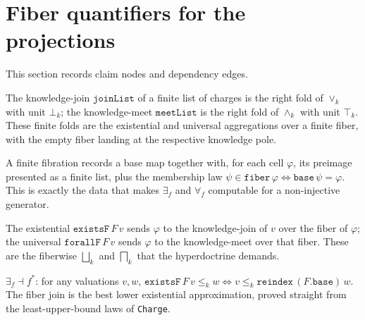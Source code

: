 \section{Fiber quantifiers for the projections}

This section records claim nodes and dependency edges.

\begin{proposition}\label{thm:charge-joinList}\leanok{}
The knowledge-join $\texttt{joinList}$ of a finite list of charges is the right
fold of $\vee_k$ with unit $\bot_k$; the knowledge-meet $\texttt{meetList}$ is the
right fold of $\wedge_k$ with unit $\top_k$. These finite folds are the
existential and universal aggregations over a finite fiber, with the empty fiber
landing at the respective knowledge pole.
\end{proposition}
\begin{proposition}\label{thm:finiteFibration}\leanok{}
A finite fibration records a base map together with, for each cell $\varphi$, its
preimage presented as a finite list, plus the membership law $\psi \in
\texttt{fiber}\,\varphi \iff \texttt{base}\,\psi = \varphi$. This is exactly the
data that makes $\exists_{f}$ and $\forall_{f}$ computable for a non-injective
generator.
\end{proposition}
\begin{proposition}\label{thm:existsF}\leanok{}
The existential $\texttt{existsF}\,F\,v$ sends $\varphi$ to the knowledge-join of
$v$ over the fiber of $\varphi$; the universal $\texttt{forallF}\,F\,v$ sends
$\varphi$ to the knowledge-meet over that fiber. These are the fiberwise
$\bigsqcup_k$ and $\bigsqcap_k$ that the hyperdoctrine demands.
\end{proposition}
\begin{theorem}\label{thm:existsF-adjunction}\leanok{}
$\exists_{f} \dashv f^{*}$: for any valuations $v, w$, $\texttt{existsF}\,F\,v
\le_k w \iff v \le_k \texttt{reindex}\,(F.\texttt{base})\,w$. The fiber join is the
best lower existential approximation, proved straight from the least-upper-bound
laws of \texttt{Charge}.
\end{theorem}
